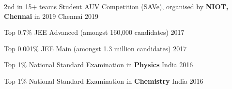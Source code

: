 \begin{cvhonors}

  \cvhonor
    {2nd in 15+ teams}
    {Student AUV Competition (SAVe), \break organised by\textbf{ NIOT, Chennai} in 2019} 
    {Chennai} 
    {2019}
 
  \cvhonor
  {Top 0.7\%}
  {JEE Advanced (amongst 160,000 candidates)}
  {}
  {2017}

  \cvhonor
  {Top 0.001\%}
  {JEE Main (amongst 1.3 million candidates)}
  {}
  {2017}
  
  \cvhonor
  {Top 1\%} 
  {National Standard Examination in \textbf{Physics}}
  {India}
  {2016}
 
  \cvhonor
  {Top 1\%} 
  {National Standard Examination in \textbf{Chemistry}}
  {India}
  {2016}

\end{cvhonors}

